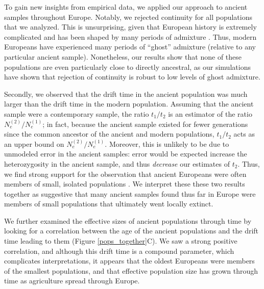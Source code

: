 \documentclass[11pt, oneside]{article}   	%
\begin{document}
To gain new insights from empirical data, we applied our approach to ancient samples throughout Europe. Notably, we rejected continuity for all populations that we analyzed. This is unsurprising, given that European history is extremely complicated and has been shaped by many periods of admixture \citep{lazaridis2014ancient, haak2015massive, lazaridis2016genomic}. Thus, modern Europeans have experienced many periods of ``ghost'' admixture (relative to any particular ancient sample). Nonetheless, our results show that none of these populations are even particularly close to directly ancestral, as our simulations have shown that rejection of continuity is robust to low levels of ghost admixture.

Secondly, we observed that the drift time in the ancient population was much larger than the drift time in the modern population. Assuming that the ancient sample were a contemporary sample, the ratio $t_1/t_2$ is an estimator of the ratio $N_e^{(2)}/N_e^{(1)}$; in fact, because the ancient sample existed for fewer generations since the common ancestor of the ancient and modern populations, $t_1/t_2$ acts as an upper bound on $N_e^{(2)}/N_e^{(1)}$. Moreover, this is unlikely to be due to unmodeled error in the ancient samples: error would be expected increase the heterozygosity in the ancient sample, and thus \emph{decrease} our estimates of $t_2$. Thus, we find strong support for the observation that ancient Europeans were often members of small, isolated populations \citep{skoglund2014genomic}. We interpret these these two results together as suggestive that many ancient samples found thus far in Europe were members of small populations that ultimately went locally extinct. 

We further examined the effective sizes of ancient populations through time by looking for a correlation between the age of the ancient populations and the drift time leading to them (Figure \ref{pops_together}C). We saw a strong positive correlation, and although this drift time is a compound parameter, which complicates interpretations, it appears that the oldest Europeans were members of the smallest populations, and that effective population size has grown through time as agriculture spread through Europe.
\end{document}
